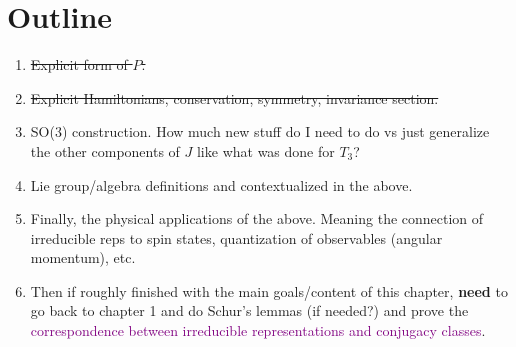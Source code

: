 \section{Outline}
    \begin{enumerate}
        \item \sout{Explicit form of $P$.}
        \item \sout{Explicit Hamiltonians, conservation, symmetry, invariance section.}
        \item SO(3) construction. How much new stuff do I need to do vs just generalize the other components of $J$ like what was done for $T_3$?
        \item Lie group/algebra definitions and contextualized in the above.
        \item Finally, the physical applications of the above. Meaning the connection of irreducible reps to spin states, quantization of observables (angular momentum), etc.
        \item Then if roughly finished with the main goals/content of this chapter, \textbf{need} to go back to chapter 1 and do Schur's lemmas (if needed?) and prove the \textcolor{purple}{correspondence between irreducible representations and conjugacy classes}.
    \end{enumerate}